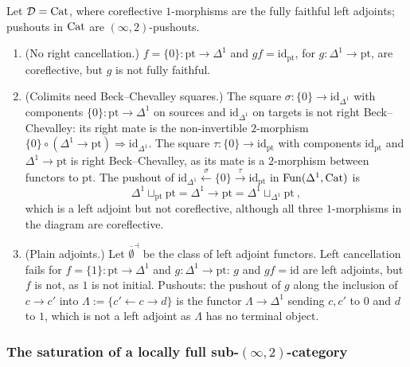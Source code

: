 \begin{exmp}
\label{ex:saturation-fails}
%
Let $\mathcal{D} = \mathrm{Cat}$, where coreflective $1$-morphisms are the fully faithful left
adjoints; pushouts in $\mathrm{Cat}$ are $(\infty,2)$-pushouts.
\begin{enumerate}
\item (No right cancellation.)
$f = \{0\}\colon \mathrm{pt} \to \Delta^{1}$
and
$gf = \mathrm{id}_{\mathrm{pt}}$,
for
$g\colon \Delta^{1} \to \mathrm{pt}$,
are coreflective, but $g$ is not fully faithful.
\item (Colimits need Beck--Chevalley squares.) The square
$\sigma\colon \{0\} \to \mathrm{id}_{\Delta^{1}}$
with components
$\{0\}\colon \mathrm{pt} \to \Delta^{1}$
on sources and
$\mathrm{id}_{\Delta^{1}}$
on targets is not right Beck--Chevalley:
its right mate is the non-invertible $2$-morphism
$\{0\} \circ (\Delta^{1} \to \mathrm{pt}) \Rightarrow \mathrm{id}_{\Delta^{1}}$.
The square
$\tau\colon \{0\} \to \mathrm{id}_{\mathrm{pt}}$
with components
$\mathrm{id}_{\mathrm{pt}}$
and
$\Delta^{1} \to \mathrm{pt}$
is right Beck--Chevalley, as its mate is a $2$-morphism between functors to
$\mathrm{pt}$. The pushout of
$\mathrm{id}_{\Delta^{1}} \xleftarrow{\sigma} \{0\} \xrightarrow{\tau}
\mathrm{id}_{\mathrm{pt}}$
in
$\operatorname{Fun}(\Delta^{1},\mathrm{Cat})$
is
\begin{equation*}
\Delta^{1} \sqcup_{\mathrm{pt}} \mathrm{pt} = \Delta^{1} \longrightarrow
\mathrm{pt} = \Delta^{1} \sqcup_{\Delta^{1}} \mathrm{pt} \ ,
\end{equation*}
which is a left adjoint but not coreflective,
although all three $1$-morphisms in the diagram are coreflective.
\item (Plain adjoints.) Let
$\overline{\emptyset}^{\dashv}$
be the class of left adjoint functors. Left cancellation fails for
$f = \{1\}\colon \mathrm{pt} \to \Delta^{1}$
and
$g\colon \Delta^{1} \to \mathrm{pt}$:
$g$ and $gf = \mathrm{id}$ are left adjoints, but $f$ is not,
as $1$ is not initial. Pushouts: the pushout of $g$ along the inclusion of $c
\to c'$ into
$\Lambda := \{c' \leftarrow c \to d\}$
is the functor
$\Lambda \to \Delta^{1}$
sending $c,c'$ to $0$ and $d$ to $1$, which is not a left adjoint as $\Lambda$
has no terminal object.
\end{enumerate}
\end{exmp}

\subsubsection*{The saturation of a locally full sub-$(\infty,2)$-category}

